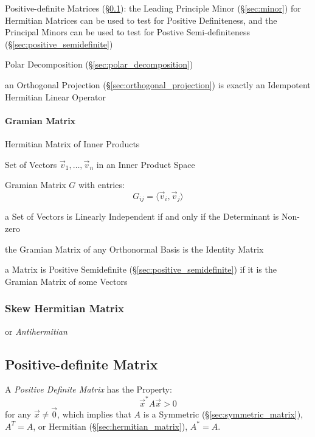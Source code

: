 Positive-definite Matrices (\S\ref{sec:positive_definite}): the Leading
Principle Minor (\S\ref{sec:minor}) for Hermitian Matrices can be used to test
for Positive Definiteness, and the Principal Minors can be used to test for
Postive Semi-definiteness (\S\ref{sec:positive_semidefinite})

Polar Decomposition (\S\ref{sec:polar_decomposition})

an Orthogonal Projection (\S\ref{sec:orthogonal_projection}) is exactly an
Idempotent Hermitian Linear Operator



\paragraph{Gramian Matrix}\label{sec:gramian_matrix}\hfill

Hermitian Matrix of Inner Products

Set of Vectors $\vec{v}_1,\ldots,\vec{v}_n$ in an Inner Product Space

Gramian Matrix $G$ with entries:
\[
  G_{ij} = \langle{\vec{v}_i,\vec{v}_j}\rangle
\]

a Set of Vectors is Linearly Independent if and only if the Determinant is
Non-zero

the Gramian Matrix of any Orthonormal Basis is the Identity Matrix

a Matrix is Positive Semidefinite (\S\ref{sec:positive_semidefinite}) if it is
the Gramian Matrix of some Vectors



\subsubsection{Skew Hermitian Matrix}\label{sec:skew_hermitian}

or \emph{Antihermitian}



\subsection{Positive-definite Matrix}\label{sec:positive_definite}

A \emph{Positive Definite Matrix} has the Property:
\[
  \vec{x}^* A \vec{x} > 0
\]
for any $\vec{x} \neq \vec{0}$, which implies that $A$ is a Symmetric
(\S\ref{sec:symmetric_matrix}), $A^T = A$, or Hermitian
(\S\ref{sec:hermitian_matrix}), $A^* = A$.

